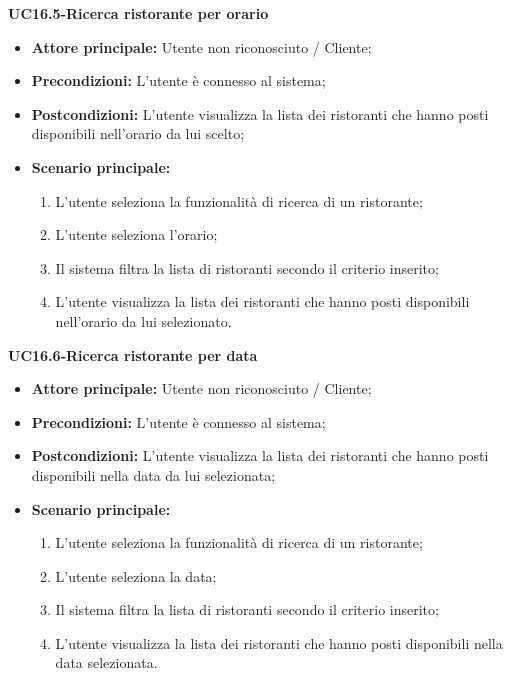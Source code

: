 \textbf{UC16.5-Ricerca ristorante per orario}
\begin{itemize}
\item \textbf{Attore principale:} Utente non riconosciuto / Cliente;
\item \textbf{Precondizioni:} L'utente è connesso al sistema;
\item \textbf{Postcondizioni:} L'utente visualizza la lista dei ristoranti che hanno posti disponibili nell'orario da lui scelto;
\item \textbf{Scenario principale:}
\begin{enumerate}
    \item L'utente seleziona la funzionalità di ricerca di un ristorante;
    \item L'utente seleziona l'orario;
    \item Il sistema filtra la lista di ristoranti secondo il criterio inserito;
    \item L'utente visualizza la lista dei ristoranti che hanno posti disponibili nell'orario da lui selezionato.
\end{enumerate}
\end{itemize}

\textbf{UC16.6-Ricerca ristorante per data}
\begin{itemize}
\item \textbf{Attore principale:} Utente non riconosciuto / Cliente;
\item \textbf{Precondizioni:} L'utente è connesso al sistema;
\item \textbf{Postcondizioni:} L'utente visualizza la lista dei ristoranti che hanno posti disponibili nella data da lui selezionata;
\item \textbf{Scenario principale:}
\begin{enumerate}
    \item L'utente seleziona la funzionalità di ricerca di un ristorante;
    \item L'utente seleziona la data;
    \item Il sistema filtra la lista di ristoranti secondo il criterio inserito;
    \item L'utente visualizza la lista dei ristoranti che hanno posti disponibili nella data selezionata.
\end{enumerate}
\end{itemize}

\pagebreak
